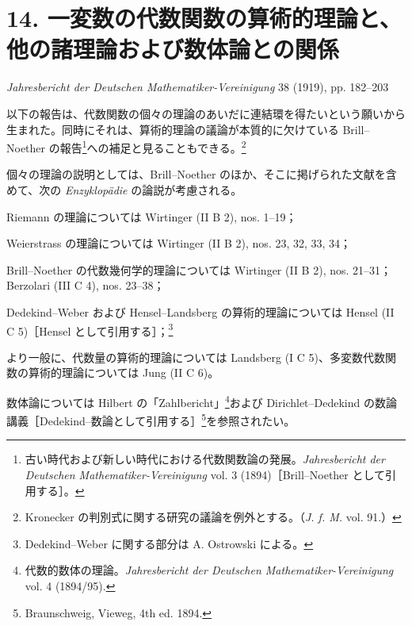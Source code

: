 \documentclass[11pt]{article}
\providecommand{\p}{\partial}
\begin{document}
\providecommand{\p}{\partial}
\providecommand{\frS}{\mathfrak S}
\providecommand{\frp}{\mathfrak p}
\providecommand{\fra}{\mathfrak a}
\providecommand{\frb}{\mathfrak b}
\providecommand{\frc}{\mathfrak c}
\providecommand{\frf}{\mathfrak f}
\providecommand{\frr}{\mathfrak r}
\providecommand{\frm}{\mathfrak m}
\providecommand{\frD}{\mathfrak D}
\providecommand{\calA}{\mathcal A}
\providecommand{\calB}{\mathcal B}
\providecommand{\calN}{\mathcal N}

\section*{14. 一変数の代数関数の算術的理論と、他の諸理論および数体論との関係}
\begin{center}
\emph{Jahresbericht der Deutschen Mathematiker-Vereinigung} 38 (1919), pp. 182--203
\end{center}

以下の報告は、代数関数の個々の理論のあいだに連結環を得たいという願いから生まれた。同時にそれは、算術的理論の議論が本質的に欠けている Brill--Noether の報告\footnote{古い時代および新しい時代における代数関数論の発展。\emph{Jahresbericht der Deutschen Mathematiker-Vereinigung} vol. 3 (1894)［Brill--Noether として引用する］。}への補足と見ることもできる。\footnote{Kronecker の判別式に関する研究の議論を例外とする。（\emph{J. f. M.} vol. 91.）}

個々の理論の説明としては、Brill--Noether のほか、そこに掲げられた文献を含めて、次の \emph{Enzyklopädie} の論説が考慮される。

Riemann の理論については Wirtinger (II B 2), nos. 1--19；

Weierstrass の理論については Wirtinger (II B 2), nos. 23, 32, 33, 34；

Brill--Noether の代数幾何学的理論については Wirtinger (II B 2), nos. 21--31；Berzolari (III C 4), nos. 23--38；

Dedekind--Weber および Hensel--Landsberg の算術的理論については Hensel (II C 5)［Hensel として引用する］；\footnote{Dedekind--Weber に関する部分は A. Ostrowski による。}

より一般に、代数量の算術的理論については Landsberg (I C 5)、多変数代数関数の算術的理論については Jung (II C 6)。

数体論については Hilbert の「Zahlbericht」\footnote{代数的数体の理論。\emph{Jahresbericht der Deutschen Mathematiker-Vereinigung} vol. 4 (1894/95).}および Dirichlet--Dedekind の数論講義［Dedekind--数論として引用する］\footnote{Braunschweig, Vieweg, 4th ed. 1894.}を参照されたい。
\end{document}
